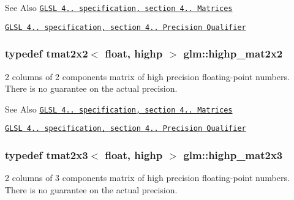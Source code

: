 \begin{DoxySeeAlso}{See Also}
\href{http://www.opengl.org/registry/doc/GLSLangSpec.4.20.8.pdf}{\tt G\-L\-S\-L 4.. specification, section 4.. Matrices} 

\href{http://www.opengl.org/registry/doc/GLSLangSpec.4.20.8.pdf}{\tt G\-L\-S\-L 4.. specification, section 4.. Precision Qualifier} 
\end{DoxySeeAlso}
\hypertarget{group__core__precision_ga20b66861ebdfa14586f4028c5ef16d2e}{
\subsubsection[{highp\-\_\-mat2x2}]{\setlength{\rightskip}{0pt plus 5cm}typedef tmat2x2$<$ float, highp $>$ {\bf glm\-::highp\-\_\-mat2x2}}}\label{group__core__precision_ga20b66861ebdfa14586f4028c5ef16d2e}
2 columns of 2 components matrix of high precision floating-\/point numbers. There is no guarantee on the actual precision.

\begin{DoxySeeAlso}{See Also}
\href{http://www.opengl.org/registry/doc/GLSLangSpec.4.20.8.pdf}{\tt G\-L\-S\-L 4.. specification, section 4.. Matrices} 

\href{http://www.opengl.org/registry/doc/GLSLangSpec.4.20.8.pdf}{\tt G\-L\-S\-L 4.. specification, section 4.. Precision Qualifier} 
\end{DoxySeeAlso}
\hypertarget{group__core__precision_ga96ec9c154598fcc1c113d9ebd3680097}{
\subsubsection[{highp\-\_\-mat2x3}]{\setlength{\rightskip}{0pt plus 5cm}typedef tmat2x3$<$ float, highp $>$ {\bf glm\-::highp\-\_\-mat2x3}}}\label{group__core__precision_ga96ec9c154598fcc1c113d9ebd3680097}
2 columns of 3 components matrix of high precision floating-\/point numbers. There is no guarantee on the actual precision.

